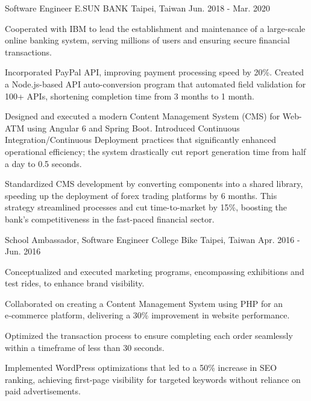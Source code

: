 \begin{cventries}
  \cventry
    {Software Engineer} %
    {E.SUN BANK} %
    {Taipei, Taiwan} %
    {Jun. 2018 - Mar. 2020} %
    {
      \begin{cvitems} %
        \item {Cooperated with IBM to lead the establishment and maintenance of a large-scale online banking system, serving millions of users and ensuring secure financial transactions.}
        \item {Incorporated PayPal API, improving payment processing speed by 20\%. Created a Node.js-based API auto-conversion program that automated field validation for 100+ APIs, shortening completion time from 3 months to 1 month.}
        \item {Designed and executed a modern Content Management System (CMS) for Web-ATM using Angular 6 and Spring Boot. Introduced Continuous Integration/Continuous Deployment practices that significantly enhanced operational efficiency; the system drastically cut report generation time from half a day to 0.5 seconds.}
        \item {Standardized CMS development by converting components into a shared library, speeding up the deployment of forex trading platforms by 6 months. This strategy streamlined processes and cut time-to-market by 15\%, boosting the bank's competitiveness in the fast-paced financial sector.}
      \end{cvitems}
    }

  \cventry
    {School Ambassador, Software Engineer} %
    {College Bike} %
    {Taipei, Taiwan} %
    {Apr. 2016 - Jun. 2016} %
    {
      \begin{cvitems} %
        \item {Conceptualized and executed marketing programs, encompassing exhibitions and test rides, to enhance brand visibility.}
        \item {Collaborated on creating a Content Management System using PHP for an e‑commerce platform, delivering a 30\% improvement in website performance.}
        \item {Optimized the transaction process to ensure completing each order seamlessly within a timeframe of less than 30 seconds.}
        \item {Implemented WordPress optimizations that led to a 50\% increase in SEO ranking, achieving first‑page visibility for targeted keywords without reliance on paid advertisements.}
      \end{cvitems}
    }


\end{cventries}

